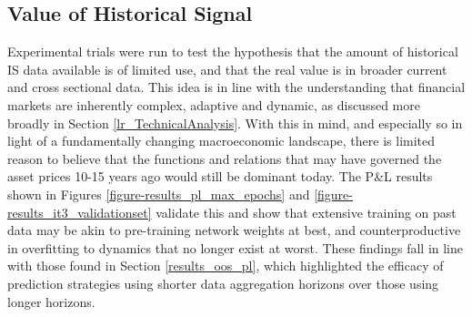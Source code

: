 \documentclass[a4paper,11pt,oneside]{article}
\theoremstyle{plain}
\theoremstyle{definition}
\begin{document}
\begin{figure}[H]
			\label{figure_ogdlr_delta_encoding_groups}
		\end{figure}
		
		
		
		
		\newpage

	\subsection{Value of Historical Signal}\label{results_data_hist}
		
	Experimental trials were run to test the hypothesis that the amount of historical IS data available is of limited use, and that the real value is in broader current and cross sectional data. This idea is in line with the understanding that financial markets are inherently complex, adaptive and dynamic, as discussed more broadly in Section \ref{lr_TechnicalAnalysis}. With this in mind, and especially so in light of a fundamentally changing macroeconomic landscape, there is limited reason to believe that the functions and relations that may have governed the asset prices 10-15 years ago would still be dominant today. The P\&L results shown in Figures \ref{figure-results_pl_max_epochs} and \ref{figure-results_it3_validationset} validate this and show that extensive training on past data may be akin to pre-training network weights at best, and counterproductive in overfitting to dynamics that no longer exist at worst. These findings fall in line with those found in Section \ref{results_oos_pl}, which highlighted the efficacy of prediction strategies using shorter data aggregation horizons over those using longer horizons.
	
\end{document}

